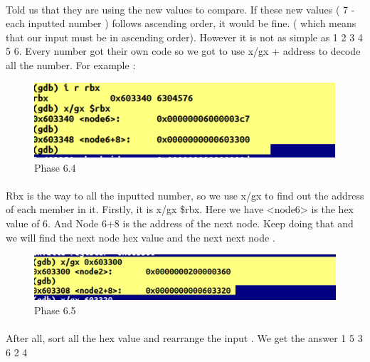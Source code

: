 \documentclass[a4paper]{article}
\begin{document}
\paragraph{}
Told us that they are using the new values to compare. If these new values ( 7 - each inputted number ) follows ascending order, it would be fine. ( which means that our input must be in ascending order). 
However it is not as simple as 1 2 3 4 5 6. Every number got their own code so we got to use x/gx + address to decode all the number.  For example : 

\begin{figure}[h!]
  \includegraphics[width=\linewidth]{bai6_4.png}
  \caption{Phase 6.4}
  \label{}
\end{figure}

\paragraph{}
Rbx is the way to all the inputted number, so we use x/gx to find out the address of each member in it. Firstly, it is x/gx \$rbx. Here we have <node6> is the hex value of 6. And Node 6+8 is the address of the next node. Keep doing that and we will find the next node hex value and the next next node . 

\begin{figure}[h!]
  \includegraphics[width=\linewidth]{bai6_5.png}
  \caption{Phase 6.5}
  \label{}
\end{figure}

\paragraph{}
After all, sort all the hex value and rearrange the input .
We get the answer 1 5 3 6 2 4



\clearpage
\end{document}
